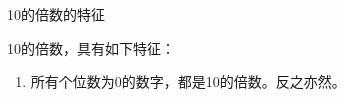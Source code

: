 \documentclass[aspectratio=169]{ctexbeamer} %
\date{\today}
\begin{document}
\begin{frame}[t]{10的倍数的特征}
\begin{spacing}{1.2}
\normalsize
10的倍数，具有如下特征：
\begin{enumerate}[label={\arabic*.}]
\item 所有个位数为0的数字，都是10的倍数。反之亦然。
\end{enumerate}

\end{spacing}
\end{frame}
\end{document}
